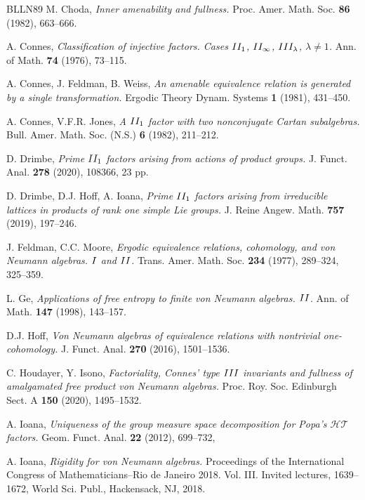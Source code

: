 \documentclass[11pt]{amsart}
\numberwithin{equation}{section}
\theoremstyle{plain}
\theoremstyle{definition}
\begin{document}
\begin{thebibliography}{BLLN89}
 {\sc M. Choda}, {\it Inner amenability and fullness.} Proc. Amer. Math. Soc. {\bf 86} (1982), 663--666.

 {\sc A. Connes}, {\it Classification of injective factors. Cases ${\rm II_1}$, ${\rm II_\infty}$, ${\rm III_\lambda}$, $\lambda \neq 1$.} Ann. of Math. {\bf 74} (1976), 73--115.

 {\sc A. Connes, J. Feldman, B. Weiss}, {\it An amenable equivalence relation is generated by a single transformation.} Ergodic Theory Dynam. Systems {\bf 1} (1981), 431--450.

 {\sc A. Connes, V.F.R. Jones}, {\it A ${\rm II_1}$ factor with two nonconjugate Cartan subalgebras.} Bull. Amer. Math. Soc. (N.S.) {\bf 6} (1982), 211--212.

 {\sc D. Drimbe}, {\it Prime ${\rm II_1}$ factors arising from actions of product groups.} J. Funct. Anal. {\bf 278} (2020), 108366, 23 pp.

 {\sc D. Drimbe, D.J. Hoff, A. Ioana}, {\it Prime ${\rm II_1}$ factors arising from irreducible lattices in products of rank one simple Lie groups.} J. Reine Angew. Math. {\bf 757} (2019), 197--246.

 {\sc J. Feldman, C.C. Moore}, {\it Ergodic equivalence relations, cohomology, and von Neumann algebras. ${\rm I}$ and ${\rm II}$.} Trans. Amer. Math. Soc. {\bf 234} (1977), 289--324, 325--359.

 {\sc L. Ge}, {\it Applications of free entropy to finite von Neumann algebras. ${\rm II}$.} Ann. of Math. {\bf 147} (1998), 143--157.

 {\sc D.J. Hoff}, {\it Von Neumann algebras of equivalence relations with nontrivial one-cohomology.} J. Funct. Anal. {\bf 270} (2016), 1501--1536.

 {\sc C. Houdayer, Y. Isono}, {\it Factoriality, Connes'\! type ${\rm III}$ invariants and fullness of amalgamated free product von Neumann algebras.} Proc. Roy. Soc. Edinburgh Sect. A {\bf 150} (2020), 1495--1532.

 {\sc A. Ioana}, {\it Uniqueness of the group measure space decomposition for Popa’s $\mathcal{HT}$ factors.} Geom. Funct. Anal. {\bf 22} (2012), 699--732,

 {\sc A. Ioana}, {\it Rigidity for von Neumann algebras.} Proceedings of the International Congress of Mathematicians--Rio de Janeiro 2018. Vol. III. Invited lectures, 1639--1672, World Sci. Publ., Hackensack, NJ, 2018.


\end{thebibliography}
\end{document}
